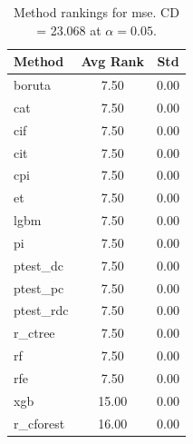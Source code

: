 \begin{table}[h]
\centering
\caption{Method rankings for mse. CD = 23.068 at $\alpha=0.05$.}
\label{tab:ranks_mse}
\begin{tabular}{lcc}
\toprule
Method & Avg Rank & Std \\
\midrule
boruta & 7.50 & 0.00 \\
cat & 7.50 & 0.00 \\
cif & 7.50 & 0.00 \\
cit & 7.50 & 0.00 \\
cpi & 7.50 & 0.00 \\
et & 7.50 & 0.00 \\
lgbm & 7.50 & 0.00 \\
pi & 7.50 & 0.00 \\
ptest_dc & 7.50 & 0.00 \\
ptest_pc & 7.50 & 0.00 \\
ptest_rdc & 7.50 & 0.00 \\
r_ctree & 7.50 & 0.00 \\
rf & 7.50 & 0.00 \\
rfe & 7.50 & 0.00 \\
xgb & 15.00 & 0.00 \\
r_cforest & 16.00 & 0.00 \\
\bottomrule
\end{tabular}
\end{table}